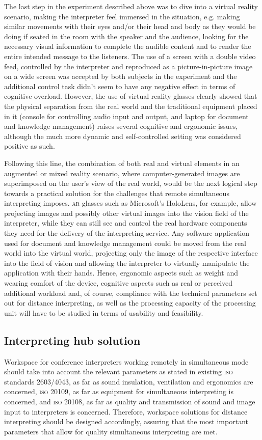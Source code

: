\documentclass[output=paper]{langsci/langscibook}
\begin{document}
The last step in the experiment described above was to dive into a virtual reality scenario, making the interpreter feel immersed in the situation, e.g. making similar movements with their eyes and/or their head and body as they would be doing if seated in the room with the speaker and the audience, looking for the necessary visual information to complete the audible content and to render the entire intended message to the listeners. The use of a screen with a double video feed, controlled by the interpreter and reproduced as a picture-in-picture image on a wide screen was accepted by both subjects in the experiment and the additional control task didn’t seem to have any negative effect in terms of cognitive overload. However, the use of virtual reality glasses clearly showed that the physical separation from the real world and the traditional equipment placed in it (console for controlling audio input and output, and laptop for document and knowledge management) raises several cognitive and ergonomic issues, although the much more dynamic and self-controlled setting was considered positive as such. 

Following this line, the combination of both real and virtual elements in an augmented or mixed reality scenario, where computer-generated images are superimposed on the user’s view of the real world, would be the next logical step towards a practical solution for the challenges that remote simultaneous interpreting imposes. \textsc{ar} glasses such as Microsoft’s HoloLens, for example, allow projecting images and possibly other virtual images into the vision field of the interpreter, while they can still see and control the real hardware components they need for the delivery of the interpreting service. Any software application used for document and knowledge management could be moved from the real world into the virtual world, projecting only the image of the respective interface into the field of vision and allowing the interpreter to virtually manipulate the application with their hands. Hence, ergonomic aspects such as weight and wearing comfort of the device, cognitive aspects such as real or perceived additional workload and, of course, compliance with the technical parameters set out for distance interpreting, as well as the processing capacity of the processing unit will have to be studied in terms of usability and feasibility.

\subsection{Interpreting hub solution}
\label{sub:ziegler:6.2}
Workspace for conference interpreters working remotely in simultaneous mode should take into account the relevant parameters as stated in existing \textsc{iso} standards 2603/4043, as far as sound insulation, ventilation and ergonomics are concerned, \textsc{iso} 20109, as far as equipment for simultaneous interpreting is concerned, and \textsc{iso} 20108, as far as quality and transmission of sound and image input to interpreters is concerned. Therefore, workspace solutions for distance interpreting should be designed accordingly, assuring that the most important parameters that allow for quality simultaneous interpreting are met.
\end{document}
